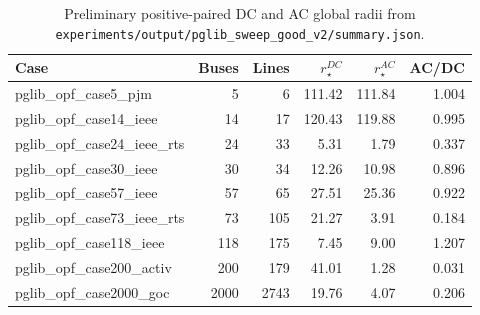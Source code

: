 \begin{table}[t]
\centering
\caption{Preliminary positive-paired DC and AC global radii from \texttt{experiments/output/pglib\_sweep\_good\_v2/summary.json}.\label{tab:dc-ac}}
\footnotesize
\begin{tabularx}{\textwidth}{@{}Xrrrrr@{}}
\toprule
Case & Buses & Lines & $r_\star^{DC}$ & $r_\star^{AC}$ & AC/DC \\
\midrule
pglib\_opf\_case5\_pjm & 5 & 6 & 111.42 & 111.84 & 1.004 \\
pglib\_opf\_case14\_ieee & 14 & 17 & 120.43 & 119.88 & 0.995 \\
pglib\_opf\_case24\_ieee\_rts & 24 & 33 & 5.31 & 1.79 & 0.337 \\
pglib\_opf\_case30\_ieee & 30 & 34 & 12.26 & 10.98 & 0.896 \\
pglib\_opf\_case57\_ieee & 57 & 65 & 27.51 & 25.36 & 0.922 \\
pglib\_opf\_case73\_ieee\_rts & 73 & 105 & 21.27 & 3.91 & 0.184 \\
pglib\_opf\_case118\_ieee & 118 & 175 & 7.45 & 9.00 & 1.207 \\
pglib\_opf\_case200\_activ & 200 & 179 & 41.01 & 1.28 & 0.031 \\
pglib\_opf\_case2000\_goc & 2000 & 2743 & 19.76 & 4.07 & 0.206 \\
\bottomrule
\end{tabularx}
\end{table}
